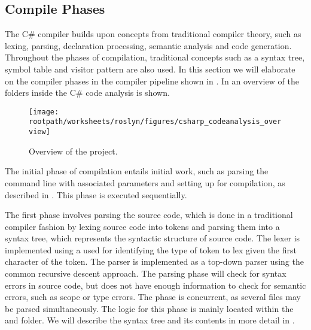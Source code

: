 \subsection{Compile Phases}
The C\# compiler builds upon concepts from traditional compiler theory, such as lexing, parsing, declaration processing, semantic analysis and code generation\cite{sebestaProLang}\cite{fischer2009crafting}. Throughout the phases of compilation, traditional concepts such as a syntax tree, symbol table and visitor pattern are also used. In this section we will elaborate on the compiler phases in the compiler pipeline shown in . In  an overview of the folders inside the C\# code analysis is shown.

\begin{figure}[htbp]
\centering
 \texttt{[image: \\rootpath/worksheets/roslyn/figures/csharp\_codeanalysis\_overview]} 
 \caption{Overview of the  project.}
\label{fig:roslyn_csharpanalysis_overview}
\end{figure}

The initial phase of compilation entails initial work, such as parsing the command line with associated parameters and setting up for compilation, as described in . This phase is executed sequentially\cite{sadovRoslynPerf}.

The first phase involves parsing the source code, which is done in a traditional compiler fashion by lexing source code into tokens and parsing them into a syntax tree, which represents the syntactic structure of source code. The lexer is implemented using a  used for identifying the type of token to lex given the first character of the token. The parser is implemented as a top-down parser using the common recursive descent approach. The parsing phase will check for syntax errors in source code, but does not have enough information to check for semantic errors, such as scope or type errors. The phase is concurrent, as several files may be parsed simultaneously\cite{sadovRoslynPerf}. The logic for this phase is mainly located within the  and  folder. We will describe the syntax tree and its contents in more detail in .


